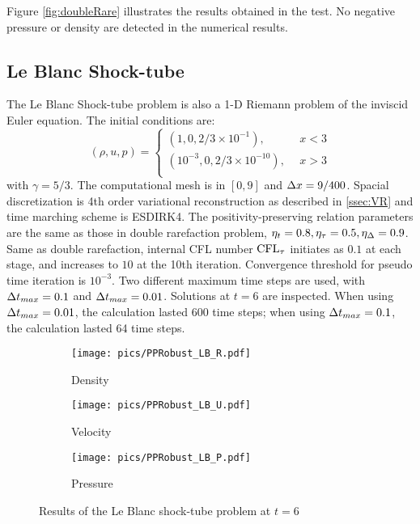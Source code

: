 Figure \ref{fig:doubleRare} illustrates the results obtained in the 
test. No negative pressure or density are detected in the numerical
results.

\subsection{Le Blanc Shock-tube}

The Le Blanc Shock-tube problem \cite{hu2013positivity} is also a 1-D 
Riemann problem of the inviscid Euler equation. 
The initial conditions are:
\begin{equation}
    (\rho,u,p) = \left\{
        \begin{array}{ll}
            (1,0,2/3\times10^{-1}),\ \ & x < 3\\
            (10^{-3},0,2/3\times10^{-10}),\ \ & x > 3\\
        \end{array}
    \right.
\end{equation}
with $\gamma = 5/3$.
The computational mesh is in $[0,9]$ and $\mathrm\Delta x =9/400$.
Spacial discretization is 4th order variational reconstruction
as described in \ref{ssec:VR} and time marching scheme is ESDIRK4. 
The positivity-preserving relation parameters are the same as 
those in double rarefaction problem, $\eta_t= 0.8, \eta_\tau=0.5, \eta_\mathrm\Delta=0.9$.
Same as double rarefaction, 
internal CFL number $\text{CFL}_\tau$ initiates as $0.1$ at each stage, and 
increases to $10$ at the 10th iteration. 
Convergence threshold for pseudo time iteration is $10^{-3}$. 
Two different maximum time steps are used, with $\mathrm\Delta t_{max} = 0.1$ and $\mathrm\Delta t_{max} = 0.01$.
Solutions at $t=6$ are inspected.
When using $\mathrm\Delta t_{max} = 0.01$, the calculation lasted 600 time steps;
when using $\mathrm\Delta t_{max} = 0.1$, the calculation lasted 64 time steps.

\begin{figure}[htbp]
    \centering
    \begin{subfigure}{0.33\textwidth}
        \texttt{[image: pics/PPRobust\_LB\_R.pdf]}
        \caption[]{Density}
    \end{subfigure}\hfill
    \begin{subfigure}{0.33\textwidth}
        \texttt{[image: pics/PPRobust\_LB\_U.pdf]}
        \caption[]{Velocity}
    \end{subfigure}\hfill
    \begin{subfigure}{0.33\textwidth}
        \texttt{[image: pics/PPRobust\_LB\_P.pdf]}
        \caption[]{Pressure}
    \end{subfigure}
    \caption{Results of the Le Blanc shock-tube problem at $t=6$}
    \label{fig:leBlanc}
\end{figure}

